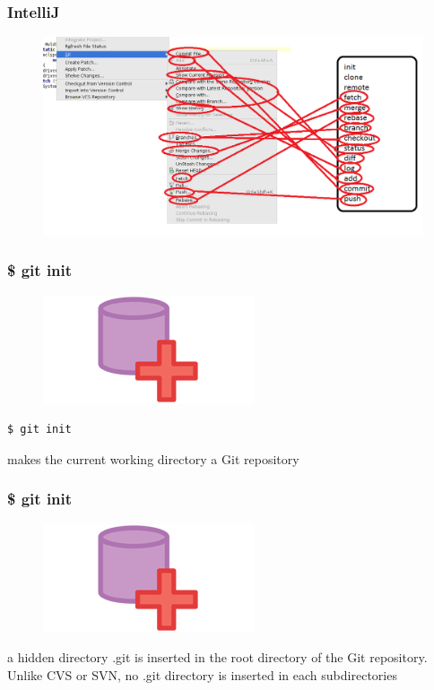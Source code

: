 \documentclass{beamer}
\begin{document}
\begin{frame}
    \frametitle{IntelliJ}
    \begin{figure}[h!]
        \begin{center}
            \includegraphics[scale=0.4]{intellij2.png}
        \end{center}
    \end{figure}
\end{frame}

\begin{frame}[fragile]
    \frametitle{\$ git init}
    \begin{figure}[h!]
        \begin{center}
            \includegraphics[scale=0.7]{init.png}
        \end{center}
    \end{figure}
    \begin{verbatim}
$ git init
    \end{verbatim}
    makes the current working directory a Git repository
\end{frame}

\begin{frame}
    \frametitle{\$ git init}
    \begin{figure}[h!]
        \begin{center}
            \includegraphics[scale=0.7]{init.png}
        \end{center}
    \end{figure}
    a hidden directory .git is inserted in the root directory
    of the Git repository. Unlike CVS or SVN, no .git directory
    is inserted in each subdirectories
\end{frame}
\end{document}
